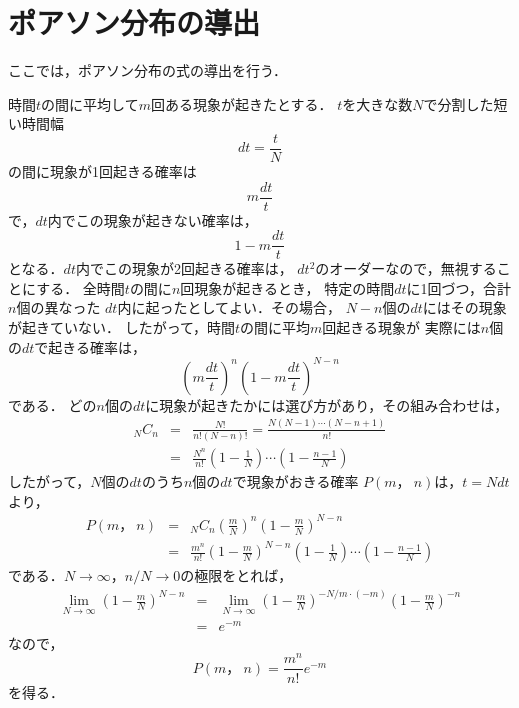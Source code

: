 \documentclass[a4j,10pt,oneside,openany]{jsbook}
\begin{document}
{\newpage

\appendix

\section{ポアソン分布の導出}\label{appendix-a}

ここでは，ポアソン分布の式の導出を行う．

時間$t$の間に平均して$m$回ある現象が起きたとする．
$t$を大きな数$N$で分割した短い時間幅
\begin{equation}
  dt=\frac{t}{N}
\end{equation}
の間に現象が1回起きる確率は
\begin{equation}
  m\frac{dt}{t}
\end{equation}
で，$dt$内でこの現象が起きない確率は，
\begin{equation}
  1-m\frac{dt}{t}
\end{equation}
となる．$dt$内でこの現象が2回起きる確率は，
$dt^2$のオーダーなので，無視することにする．
全時間$t$の間に$n$回現象が起きるとき，
特定の時間$dt$に1回づつ，合計$n$個の異なった
$dt$内に起ったとしてよい．その場合，
$N-n$個の$dt$にはその現象が起きていない．
したがって，時間$t$の間に平均$m$回起きる現象が
実際には$n$個の$dt$で起きる確率は，
\begin{equation}
  \left(m\frac{dt}{t}\right)^n\left(1-m\frac{dt}{t}\right)^{N-n}
\end{equation}
である．
どの$n$個の$dt$に現象が起きたかには選び方があり，その組み合わせは，
\begin{eqnarray}
  _NC_n&=&\frac{N!}{n!(N-n)!}=\frac{N(N-1)\cdots(N-n+1)}{n!}\nonumber \\
  &=&\frac{N^n}{n!}\left(1-\frac{1}{N}\right)\cdots
  \left(1-\frac{n-1}{N}\right)
\end{eqnarray}
したがって，$N$個の$dt$のうち$n$個の$dt$で現象がおきる確率
$P(m，~n)$は，$t=Ndt$より，
\begin{eqnarray}
  P(m，~n) &=&
  _NC_n\left(\frac{m}{N}\right)^n\left(1-\frac{m}{N}\right)^{N-n}\nonumber\\
  &=&
  \frac{m^n}{n!}\left(1-\frac mN\right)^{N-n}
  \left(1-\frac 1N\right)\cdots\left(1-\frac{n-1}{N}\right)
\end{eqnarray}
である．$N\to\infty$，$n/N\to 0$の極限をとれば，
\begin{eqnarray}
  \lim_{N\to\infty}\left(1-\frac{m}{N}\right)^{N-n}
  &=& \lim_{N\to\infty}\left(1-\frac{m}{N}\right)^{-N/m\cdot(-m)}
  \left(1-\frac{m}{N}\right)^{-n}\nonumber \\
  &=& e^{-m}
\end{eqnarray}
なので，
\begin{equation}
  P(m，~n)=\frac{m^n}{n!}e^{-m}
\end{equation}
を得る．

}
\end{document}
